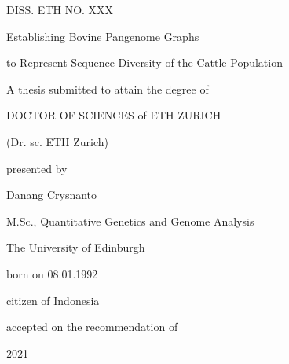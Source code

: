 \documentclass[../main.tex]{subfiles}
\begin{document}
\setlength{\parskip}{0pt}
\begin{center}
    \thispagestyle{empty}

    DISS. ETH NO. XXX 

    \vspace{2cm}

    \doublespacing
    {\large  Establishing Bovine Pangenome Graphs
    
    to Represent Sequence Diversity of the Cattle Population}

    \vspace{2cm}
    
    
    A thesis submitted to attain the degree of

    DOCTOR OF SCIENCES of ETH ZURICH

    (Dr. sc. ETH Zurich)
    \vspace{1cm}

    presented by

    \vspace{1cm}
    Danang Crysnanto  

    \vspace{1cm}

    M.Sc., Quantitative Genetics and Genome Analysis 
    
    The University of Edinburgh

    \vspace{1cm}

    born on 08.01.1992

    citizen of Indonesia

    \vspace{2cm}

    accepted on the recommendation of     
    \vspace{2cm}

    \vspace{0.5cm}
    2021
\end{center}
\end{document}
